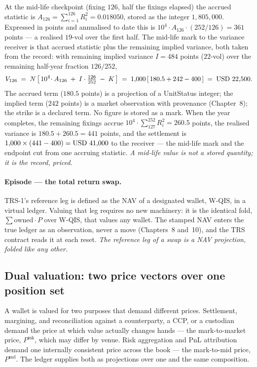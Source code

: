 At the mid-life checkpoint (fixing $126$, half the fixings elapsed) the accrued
statistic is $A_{126} = \sum_{i=1}^{126} R_i^2 = 0.018050$, stored as the
integer $1{,}805{,}000$. Expressed in points and annualised to date this is
$10^4 \cdot A_{126}\cdot(252/126) = 361$ points --- a realised $19$-vol over the
first half. The mid-life mark to the variance receiver is that accrued
statistic plus the remaining implied variance, both taken from the record: with
remaining implied variance $I = 484$ points ($22$-vol) over the remaining
half-year fraction $126/252$,
\[
  V_{126} \;=\; N\left[\,10^4\!\cdot A_{126} \;+\; I\cdot\tfrac{126}{252} \;-\; K\,\right]
         \;=\; 1{,}000\left[\,180.5 + 242 - 400\,\right] \;=\; \mbox{USD~22,500}.
\]
The accrued term ($180.5$ points) is a projection of a UnitStatus integer; the
implied term ($242$ points) is a market observation with provenance
(Chapter~8); the strike is a declared term. No figure is stored as a mark. When
the year completes, the remaining fixings accrue $10^4\!\cdot\!\sum_{127}^{252}
R_i^2 = 260.5$ points, the realised variance is $180.5 + 260.5 = 441$ points,
and the settlement is $1{,}000\times(441 - 400) = \mbox{USD~41,000}$ to the receiver
--- the mid-life mark and the endpoint cut from one accruing statistic.
\emph{A mid-life value is not a stored quantity; it is the record, priced.}

\paragraph{Episode --- the total return swap.}
TRS-1's reference leg is defined as the NAV of a designated wallet, W-QIS, in a
virtual ledger. Valuing that leg requires no new machinery: it is the identical
fold, $\sum \mathrm{owned}\cdot P$ over W-QIS, that values any wallet. The
stamped NAV enters the true ledger as an observation, never a move
(Chapters~8 and~10), and the TRS contract reads it at each reset.
\emph{The reference leg of a swap is a NAV projection, folded like any other.}

\subsection{Dual valuation: two price vectors over one position set}

A wallet is valued for two purposes that demand different prices. Settlement,
margining, and reconciliation against a counterparty, a CCP, or a custodian
demand the price at which value actually changes hands --- the mark-to-market
price, $P^{\mathrm{mk}}$, which may differ by venue. Risk aggregation and PnL
attribution demand one internally consistent price across the book --- the
mark-to-mid price, $P^{\mathrm{md}}$. The ledger supplies both as projections
over one and the same composition.

